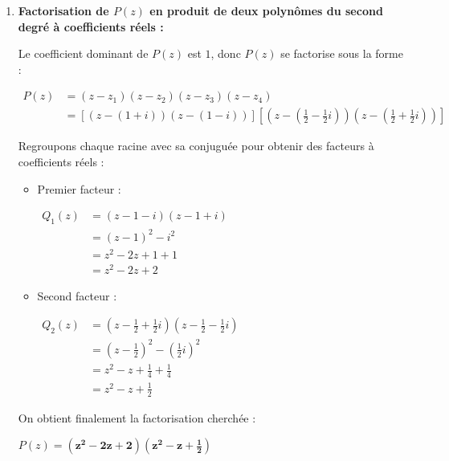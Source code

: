 \documentclass[12pt,a4paper]{article}
\begin{document}
\begin{enumerate}
    Ces quatre nombres complexes sont deux à deux distincts et le polynôme $P(z)$ est de degré $4$ : il admet donc exactement ces $4$ racines.
    
    L'ensemble des solutions dans $\mathbb{C}$ de l'équation $P(z) = 0$ est :
    
    $
    \mathcal{S} = \left\{\mathbf{1 + i \,;\, 1 - i \,;\, \frac{1}{2} - \frac{1}{2}i \,;\, \frac{1}{2} + \frac{1}{2}i}\right\}
    $

    \item \textbf{Factorisation de $P(z)$ en produit de deux polynômes du second degré à coefficients réels :}
    
    Le coefficient dominant de $P(z)$ est $1$, donc $P(z)$ se factorise sous la forme :
    
    $
    \begin{aligned}
        P(z) &= (z - z_1)(z - z_2)(z - z_3)(z - z_4)\\
        &= \left[(z - (1 + i))(z - (1 - i))\right] \left[\left(z - \left(\frac{1}{2} - \frac{1}{2}i\right)\right)\left(z - \left(\frac{1}{2} + \frac{1}{2}i\right)\right)\right]
    \end{aligned}
    $
    
    Regroupons chaque racine avec sa conjuguée pour obtenir des facteurs à coefficients réels :
    
    \begin{itemize}
        \item Premier facteur :
        
        $
        \begin{aligned}
            Q_1(z) &= (z - 1 - i)(z - 1 + i)\\
            &= (z - 1)^2 - i^2\\
            &= z^2 - 2z + 1 + 1\\
            &= z^2 - 2z + 2
        \end{aligned}
        $
        
        \item Second facteur :
        
        $
        \begin{aligned}
            Q_2(z) &= \left(z - \frac{1}{2} + \frac{1}{2}i\right)\left(z - \frac{1}{2} - \frac{1}{2}i\right)\\
            &= \left(z - \frac{1}{2}\right)^2 - \left(\frac{1}{2}i\right)^2\\
            &= z^2 - z + \frac{1}{4} + \frac{1}{4}\\
            &= z^2 - z + \frac{1}{2}
        \end{aligned}
        $
    \end{itemize}
    
    On obtient finalement la factorisation cherchée :
    
    $
    P(z) = \mathbf{\left(z^2 - 2z + 2\right)\left(z^2 - z + \frac{1}{2}\right)}
    $
\end{enumerate}
\end{document}
